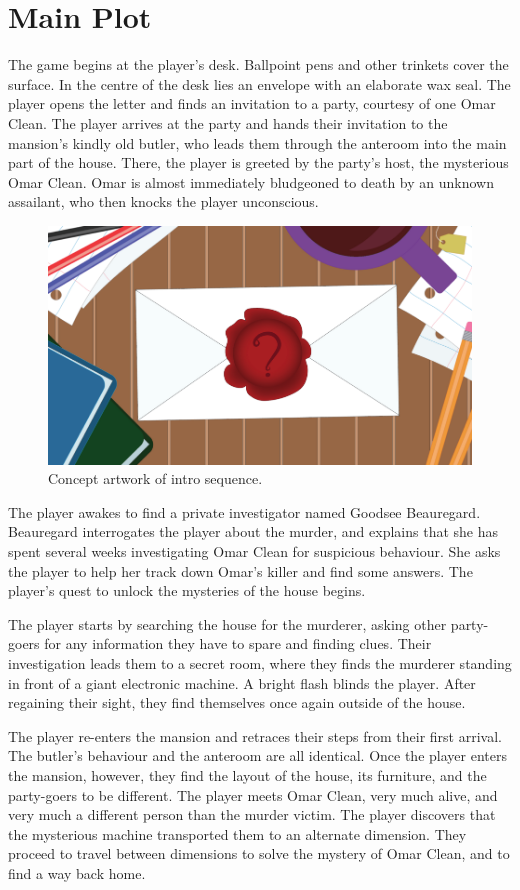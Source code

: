 \section{Main Plot}
\label{sec:mainplot}
The game begins at the player's desk. Ballpoint pens and other trinkets cover the surface. In the centre of the desk lies an envelope with an elaborate wax seal. The player opens the letter and finds an invitation to a party, courtesy of one Omar Clean. The player arrives at the party and hands their invitation to the mansion's kindly old butler, who leads them through the anteroom into the main part of the house. There, the player is greeted by the party's host, the mysterious Omar Clean. Omar is almost immediately bludgeoned to death by an unknown assailant, who then knocks the player unconscious.

\begin{figure}[htb]
\centering\includegraphics[width=.4\linewidth]{images/envelope}
\caption{Concept artwork of intro sequence.}
\label{fig:envelope}
\end{figure}

The player awakes to find a private investigator named Goodsee Beauregard. Beauregard interrogates the player about the murder, and explains that she has spent several weeks investigating Omar Clean for suspicious behaviour. She asks the player to help her track down Omar's killer and find some answers. The player's quest to unlock the mysteries of the house begins.

The player starts by searching the house for the murderer, asking other party-goers for any information they have to spare and finding clues. Their investigation leads them to a secret room, where they finds the murderer standing in front of a giant electronic machine. A bright flash blinds the player. After regaining their sight, they find themselves once again outside of the house.

The player re-enters the mansion and retraces their steps from their first arrival. The butler's behaviour and the anteroom are all identical. Once the player enters the mansion, however, they find the layout of the house, its furniture, and the party-goers to be different. The player meets Omar Clean, very much alive, and very much a different person than the murder victim. The player discovers that the mysterious machine transported them to an alternate dimension. They proceed to travel between dimensions to solve the mystery of Omar Clean, and to find a way back home.

